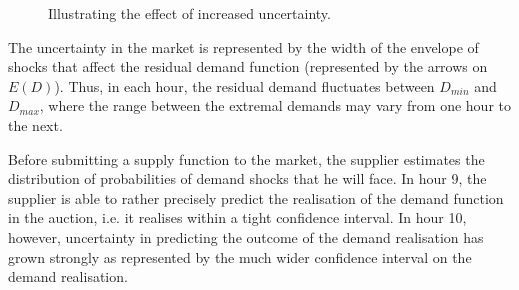 \begin{figure}[!ht]
\begin{center}  \end{center}
\caption{Illustrating the effect of increased uncertainty.}
\label{predictslope}
\end{figure}

The uncertainty in the market is represented %
 by the width of the envelope of shocks that affect the residual demand function (represented by the arrows on $E(D)$). Thus, in each hour, the residual demand fluctuates between $D_{min}$ and $D_{max}$, where the range between the extremal demands may vary from one hour to the next. 
 
Before submitting a supply function to the market, the supplier estimates the distribution of probabilities of demand shocks that he will face.  %
In hour 9, the supplier is able to rather precisely predict the realisation of the demand function in the auction, i.e. it realises within a tight confidence interval. In hour 10, however, uncertainty in predicting the outcome of the demand realisation has grown strongly as represented by the much wider confidence interval on the demand realisation. 

